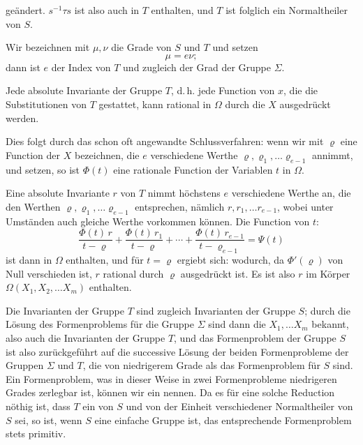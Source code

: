 

geändert. $s^{-1}\tau s$ ist also auch in $T$ enthalten, und $T$ ist folglich ein Normaltheiler von $S$.

Wir bezeichnen mit $\mu, \nu$ die Grade von $S$ und $T$ und setzen
\[
\mu = e\nu;
\]
dann ist $e$ der Index von $T$ und zugleich der Grad der Gruppe $\Sigma$.

Jede absolute Invariante der Gruppe $T$, d.\,h. jede Function von $x$, die die Substitutionen von $T$ gestattet, kann rational in $\Omega$ durch die $X$ ausgedrückt werden.

Dies folgt durch das schon oft angewandte Schlussverfahren: wenn wir mit $\varrho$ eine Function der $X$ bezeichnen, die $e$ verschiedene Werthe $\varrho, \varrho_1, \ldots \varrho_{e-1}$ annimmt, und
setzen, so ist $\Phi(t)$ eine rationale Function der Variablen $t$ in $\Omega$.

Eine absolute Invariante $r$ von $T$ nimmt höchstens $e$ verschiedene Werthe an, die den Werthen $\varrho, \varrho_1, \ldots \varrho_{e-1}$ entsprechen, nämlich $r, r_1, \ldots r_{e-1}$, wobei unter Umständen auch gleiche Werthe vorkommen können. Die Function von $t$:
\[
\frac{\Phi(t)\,r}{t-\varrho} + \frac{\Phi(t)\,r_1}{t-\varrho} + \cdots + \frac{\Phi(t)\,r_{e-1}}{t-\varrho_{e-1}} = \Psi(t) %
\]
ist dann in $\Omega$ enthalten, und für $t=\varrho$ ergiebt sich:
wodurch, da $\Phi'(\varrho)$ von Null verschieden ist, $r$ rational durch $\varrho$ ausgedrückt ist. Es ist also $r$ im Körper $\Omega(X_1, X_2, \ldots X_m)$ enthalten.

Die Invarianten der Gruppe $T$ sind zugleich Invarianten der Gruppe $S$; durch die Lösung des Formenproblems für die Gruppe $\Sigma$ sind dann die $X_1, \ldots X_m$ bekannt, also auch die Invarianten der Gruppe $T$, und das Formenproblem der Gruppe $S$ ist also zurückgeführt auf die successive Lösung der beiden Formenprobleme der Gruppen $\Sigma$ und $T$, die von niedrigerem Grade als das Formenproblem für $S$ sind. Ein Formenproblem, was in dieser Weise in zwei Formenprobleme niedrigeren Grades zerlegbar ist, können wir ein  nennen. Da es für eine solche Reduction nöthig ist, dass $T$ ein von $S$ und von der Einheit verschiedener Normaltheiler von $S$ sei, so ist, wenn $S$ eine einfache Gruppe ist, das entsprechende Formenproblem stets primitiv.

